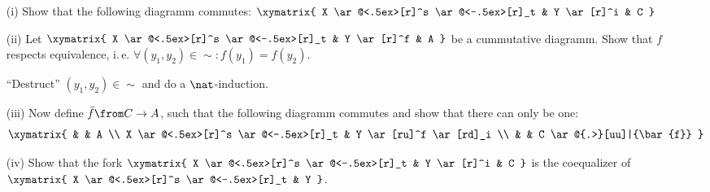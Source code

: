 \begin{exercise}
\begin{itemize}
      \begin{itemize}
        \item[(i)]Show that the following diagramm commutes:
          $\xymatrix{
            X \ar@<.5ex>[r]^s \ar@<-.5ex>[r]_t & Y \ar[r]^i & C
          }$
        \item[(ii)]Let
          $\xymatrix{
            X \ar@<.5ex>[r]^s \ar@<-.5ex>[r]_t & Y \ar[r]^f & A
          }$
          be a cummutative diagramm. Show that $f$ respects equivalence, i.\,e. $\forall (y_1, y_2) \in \sim: f(y_1) = f(y_2)$.
          \begin{hint}
            ``Destruct'' $(y_1, y_2) \in \sim$ and do a $\nat$-induction.
          \end{hint}
        \item[(iii)]Now define $\bar{f} \from C \to A$, such that the following diagramm commutes and show that there can only be one:
          \[ \xymatrix{
            & & A  \\
            X \ar@<.5ex>[r]^s \ar@<-.5ex>[r]_t & Y \ar[ru]^f \ar[rd]_i \\
            & & C \ar@{.>}[uu]|{\bar{f}}
          } \]
        \item[(iv)]Show that the fork
          $\xymatrix{
            X \ar@<.5ex>[r]^s \ar@<-.5ex>[r]_t & Y \ar[r]^i & C
          }$
          is the coequalizer of
          $\xymatrix{
            X \ar@<.5ex>[r]^s \ar@<-.5ex>[r]_t & Y
          }$.
      \end{itemize}
  \end{itemize}
\end{exercise}

